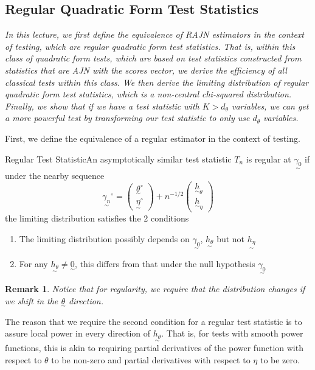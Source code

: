\documentclass[twoside]{article}
\newtheorem{remark}[theorem]{Remark}
\newcommand{\utilde}{\underset{\sim}}
\begin{document}
\subsection{Regular Quadratic Form Test Statistics}

\textit{In this lecture, we first define the equivalence of RAJN estimators in the context of testing, which are regular quadratic form test statistics. That is, within this class of quadratic form tests, which are based on test statistics constructed from statistics that are AJN with the scores vector, we derive the efficiency of all classical tests within this class. We then derive the limiting distribution of regular quadratic form test statistics, which is a non-central chi-squared distribution. Finally, we show that if we have a test statistic with $K > d_{\theta}$ variables, we can get a more powerful test by transforming our test statistic to only use $d_{\theta}$ variables.}

First, we define the equivalence of a regular estimator in the context of testing.
\begin{definition_exam}{Regular Test Statistic}{}An asymptotically similar test statistic $T_n$ is regular at $\utilde{\gamma_0}$ if under the nearby sequence 
$$
\utilde{\gamma_n}^{\circ} = \begin{pmatrix}\utilde{\theta}^{\circ}\\\utilde{\eta}^{\circ} \end{pmatrix} + n^{-1/2}\begin{pmatrix}
\utilde{h}_{\theta}\\
\utilde{h}_{\eta}
\end{pmatrix}
$$
the limiting distribution satisfies the 2 conditions 
\begin{enumerate}
\item The limiting distribution possibly depends on $\utilde{\gamma_0}$, $\utilde{h_{\theta}}$ but not $\utilde{h_{\eta}}$
\item For any $\utilde{h_{\theta}} \neq \utilde{0}$, this differs from that under the null hypothesis $\utilde{\gamma_0}$
\end{enumerate}
\end{definition_exam}

\begin{remark}Notice that for regularity, we require that the distribution changes if we shift in the $\utilde{\theta}$ direction.
\end{remark}

The reason that we require the second condition for a regular test statistic is to assure local power in every direction of $\utilde{h_{\theta}}.$ That is, for tests with smooth power functions, this is akin to requiring partial derivatives of the power function with respect to $\theta$ to be non-zero and partial derivatives with respect to $\eta$ to be zero.
\end{document}
